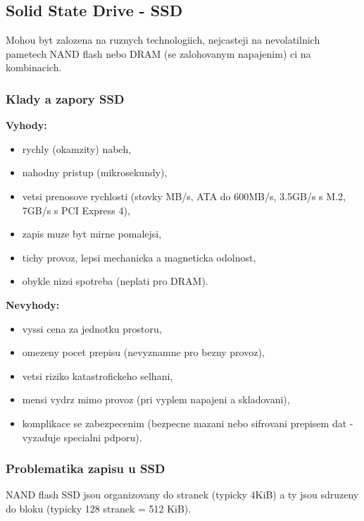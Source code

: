 \documentclass[a4paper, 11pt]{article}
\begin{document}
\newpage

\subsection{Solid State Drive - SSD}
Mohou byt zalozena na ruznych technologiich, nejcasteji na nevolatilnich pametech NAND flash nebo DRAM (se zalohovanym napajenim) ci na kombinacich.

\subsubsection{Klady a zapory SSD}

\noindent \textbf{Vyhody:}
\begin{itemize}
    \item rychly (okamzity) nabeh,
    \item nahodny pristup (mikrosekundy),
    \item vetsi prenosove rychlosti (stovky MB/s, ATA do 600MB/s, 3.5GB/s s M.2, 7GB/s s PCI Express 4),
    \item zapis muze byt mirne pomalejsi,
    \item tichy provoz, lepsi mechanicka a magneticka odolnost,
    \item obykle nizsi spotreba (neplati pro DRAM). \\
\end{itemize}

\noindent \textbf{Nevyhody:}
\begin{itemize}
    \item vyssi cena za jednotku prostoru,
    \item omezeny pocet prepisu (nevyznamne pro bezny provoz),
    \item vetsi riziko katastrofickeho selhani, 
    \item mensi vydrz mimo provoz (pri vyplem napajeni a skladovani),
    \item komplikace se zabezpecenim (bezpecne mazani nebo sifrovani prepisem dat - vyzaduje specialni pdporu). \\
\end{itemize}

\subsubsection{Problematika zapisu u SSD}
NAND flash SSD jsou organizovany do stranek (typicky 4KiB) a ty jsou sdruzeny do bloku (typicky 128 stranek = 512 KiB). \\
\end{document}

